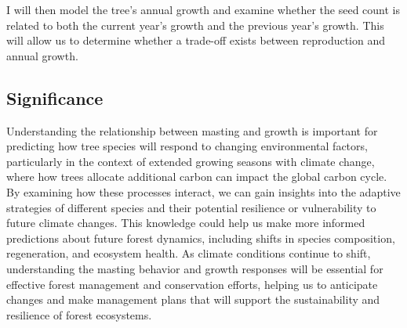 \documentclass[11pt,letter]{article}
\begin{document}
I  will then model the tree's annual growth and examine whether the seed count is related to both the current year's growth and the previous year's growth. This will allow us to determine whether a trade-off exists between reproduction and annual growth.
\subsection{Significance}
Understanding the relationship between masting and growth is important for predicting how tree species will respond to changing environmental factors, particularly in the context of extended growing seasons with climate change, where how trees allocate additional carbon can impact the global carbon cycle. By examining how these processes interact, we can gain insights into the adaptive strategies of different species and their potential resilience or vulnerability to future climate changes. This knowledge could help us make more informed predictions about future forest dynamics, including shifts in species composition, regeneration, and ecosystem health. As climate conditions continue to shift, understanding the  masting behavior and growth responses will be essential for effective forest management and conservation efforts, helping us to anticipate changes and make management plans that will support the sustainability and resilience of forest ecosystems.
\end{document}
